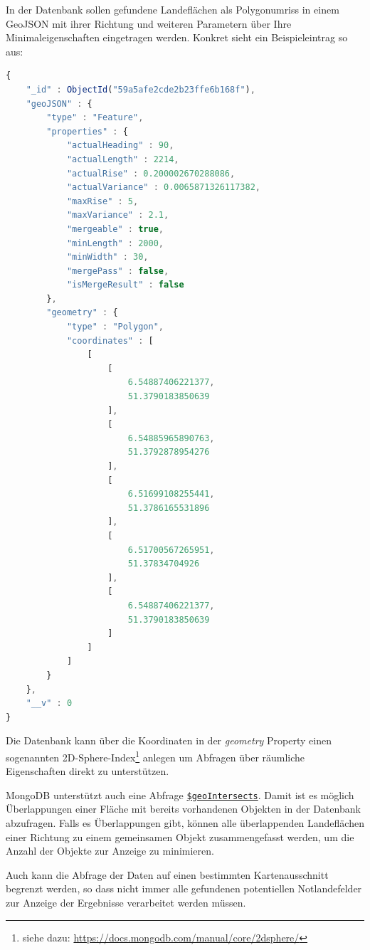 \documentclass[10pt,a4paper]{report}
\begin{document}
In der Datenbank sollen gefundene Landeflächen als Polygonumriss in einem GeoJSON mit ihrer Richtung und weiteren Parametern über Ihre Minimaleigenschaften eingetragen werden. Konkret sieht ein Beispieleintrag so aus:
\begin{lstlisting}[language=JavaScript]
{
    "_id" : ObjectId("59a5afe2cde2b23ffe6b168f"),
    "geoJSON" : {
        "type" : "Feature",
        "properties" : {
            "actualHeading" : 90,
            "actualLength" : 2214,
            "actualRise" : 0.200002670288086,
            "actualVariance" : 0.0065871326117382,
            "maxRise" : 5,
            "maxVariance" : 2.1,
            "mergeable" : true,
            "minLength" : 2000,
            "minWidth" : 30,
            "mergePass" : false,
            "isMergeResult" : false
        },
        "geometry" : {
            "type" : "Polygon",
            "coordinates" : [ 
                [ 
                    [ 
                        6.54887406221377, 
                        51.3790183850639
                    ], 
                    [ 
                        6.54885965890763, 
                        51.3792878954276
                    ], 
                    [ 
                        6.51699108255441, 
                        51.3786165531896
                    ], 
                    [ 
                        6.51700567265951, 
                        51.37834704926
                    ], 
                    [ 
                        6.54887406221377, 
                        51.3790183850639
                    ]
                ]
            ]
        }
    },
    "__v" : 0
}
\end{lstlisting}

Die Datenbank kann über die Koordinaten in der \emph{geometry} Property einen sogenannten 2D-Sphere-Index\footnote{siehe dazu: \href{https://docs.mongodb.com/manual/core/2dsphere/}{https://docs.mongodb.com/manual/core/2dsphere/}} anlegen um Abfragen über räumliche Eigenschaften direkt zu unterstützen.

MongoDB unterstützt auch eine Abfrage \href{https://docs.mongodb.com/manual/reference/operator/query/geoIntersects/#op._S_geoIntersects}{\texttt{\$geoIntersects}}. Damit ist es möglich Überlappungen einer Fläche mit bereits vorhandenen Objekten in der Datenbank abzufragen. 
Falls es Überlappungen gibt, können alle überlappenden Landeflächen einer Richtung zu einem gemeinsamen Objekt zusammengefasst werden, um die Anzahl der Objekte zur Anzeige zu minimieren.

Auch kann die Abfrage der Daten auf einen bestimmten Kartenausschnitt begrenzt werden, so dass nicht immer alle gefundenen potentiellen Notlandefelder zur Anzeige der Ergebnisse verarbeitet werden müssen.
\end{document}
